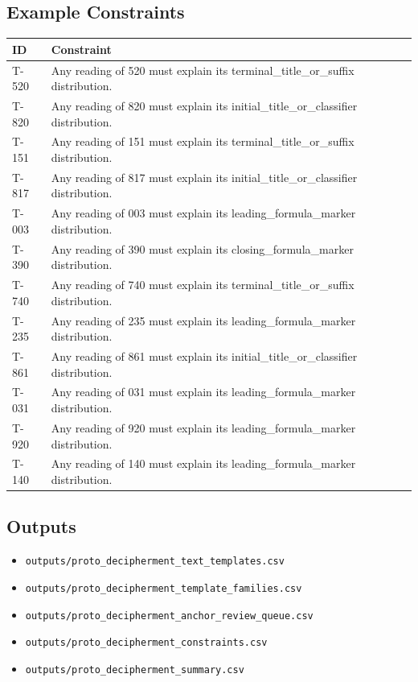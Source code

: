 \documentclass[11pt,a4paper]{article}
\begin{document}
\subsection*{Example Constraints}
\begin{center}
\begin{tabular}{lp{}}
\toprule
\textbf{ID} & \textbf{Constraint} \\
\midrule
T-520 & Any reading of 520 must explain its terminal\_title\_or\_suffix distribution. \\
T-820 & Any reading of 820 must explain its initial\_title\_or\_classifier distribution. \\
T-151 & Any reading of 151 must explain its terminal\_title\_or\_suffix distribution. \\
T-817 & Any reading of 817 must explain its initial\_title\_or\_classifier distribution. \\
T-003 & Any reading of 003 must explain its leading\_formula\_marker distribution. \\
T-390 & Any reading of 390 must explain its closing\_formula\_marker distribution. \\
T-740 & Any reading of 740 must explain its terminal\_title\_or\_suffix distribution. \\
T-235 & Any reading of 235 must explain its leading\_formula\_marker distribution. \\
T-861 & Any reading of 861 must explain its initial\_title\_or\_classifier distribution. \\
T-031 & Any reading of 031 must explain its leading\_formula\_marker distribution. \\
T-920 & Any reading of 920 must explain its leading\_formula\_marker distribution. \\
T-140 & Any reading of 140 must explain its leading\_formula\_marker distribution. \\
\bottomrule
\end{tabular}
\end{center}
\subsection*{Outputs}
\begin{itemize}
\item \texttt{outputs/proto\_decipherment\_text\_templates.csv}
\item \texttt{outputs/proto\_decipherment\_template\_families.csv}
\item \texttt{outputs/proto\_decipherment\_anchor\_review\_queue.csv}
\item \texttt{outputs/proto\_decipherment\_constraints.csv}
\item \texttt{outputs/proto\_decipherment\_summary.csv}
\end{itemize}
\end{document}

